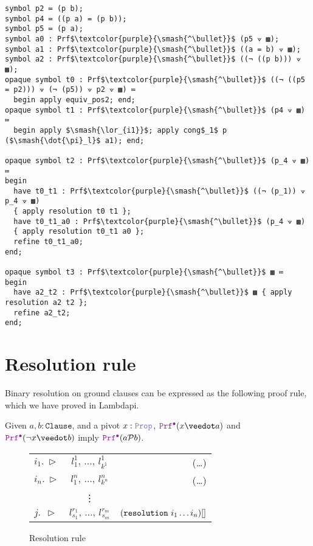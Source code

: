 \begin{lstlisting}[mathescape=true, caption={Trace from \cref{lst:smtexampleinput} encoded in Lambdapi.}, label={lst:smtexamplelambdapi}, language=Lambdapi]
symbol p2 ≔ (p b); 
symbol p4 ≔ ((p a) = (p b));
symbol p5 ≔ (p a);
symbol a0 : Prf$\textcolor{purple}{\smash{^\bullet}}$ (p5 ⟇ ▩);
symbol a1 : Prf$\textcolor{purple}{\smash{^\bullet}}$ ((a = b) ⟇ ▩);
symbol a2 : Prf$\textcolor{purple}{\smash{^\bullet}}$ ((¬ ((p b))) ⟇ ▩);
opaque symbol t0 : Prf$\textcolor{purple}{\smash{^\bullet}}$ ((¬ ((p5 = p2))) ⟇ (¬ (p5)) ⟇ p2 ⟇ ▩) ≔
  begin apply equiv_pos2; end;
opaque symbol t1 : Prf$\textcolor{purple}{\smash{^\bullet}}$ (p4 ⟇ ▩) ≔
  begin apply $\smash{\lor_{i1}}$; apply cong$_1$ p ($\smash{\dot{\pi}_l}$ a1); end;

opaque symbol t2 : Prf$\textcolor{purple}{\smash{^\bullet}}$ (p_4 ⟇ ▩) ≔ 
begin
  have t0_t1 : Prf$\textcolor{purple}{\smash{^\bullet}}$ ((¬ (p_1)) ⟇ p_4 ⟇ ▩) 
  { apply resolution t0 t1 };
  have t0_t1_a0 : Prf$\textcolor{purple}{\smash{^\bullet}}$ (p_4 ⟇ ▩)
  { apply resolution t0_t1 a0 };
  refine t0_t1_a0;
end;

opaque symbol t3 : Prf$\textcolor{purple}{\smash{^\bullet}}$ ▩ ≔ 
begin
  have a2_t2 : Prf$\textcolor{purple}{\smash{^\bullet}}$ ▩ { apply resolution a2 t2 };
  refine a2_t2;
end;
\end{lstlisting}


\section{Resolution rule}
\label{ssec:resolution}


Binary resolution on ground clauses can be expressed as the following proof rule, which we have proved in Lambdapi.

\begin{lemma}[Resolution]\label{lemma:resolution}
Given $a,b: \texttt{Clause}$, and a pivot $x: \prop$, $\pid (x \veedot a)$ and $\pid (\neg x \veedot b)$ imply $\pid (a \cal{P} b)$.
\end{lemma}

\begin{figure}[h]
  \centering
  \begin{tabular}{l c r}
  $i_1.~\triangleright$  & \qquad $l_1^1,\, \dots,\, l_{k^1}^1$ \qquad & (\dots)  \\
  $i_n.~\triangleright$  & \qquad $l_1^n,\, \dots,\, l_{k^n}^n$ \qquad & (\dots) \\
    & \vdots  &  \\
  $j.~~\triangleright$  & \qquad $l_{s_1}^{r_1},\, \dots,\, l_{s_m}^{r_m}$ \qquad & $(\texttt{\upshape{resolution}}~i_1 \dots i_n)[]$
  \end{tabular}
  \caption{Resolution rule}
  \label{fig:resolution-rule}
\end{figure}


